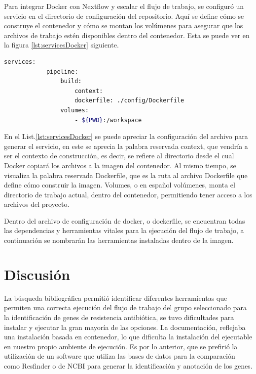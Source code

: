 \documentclass[12pt]{article}
\begin{document}
Para integrar Docker con Nextflow y escalar el 
flujo de trabajo, se configuró un servicio en el 
directorio de configuración del repositorio. Aquí se 
define cómo se construye el contenedor y cómo se montan 
los volúmenes para asegurar que los archivos de trabajo 
estén disponibles dentro del contenedor. Esta se puede ver 
en la figura \ref{lst:servicesDocker} siguiente.

\begin{center}
    \begin{lstlisting}[language=bash, caption=Código para la elaboración del servicio de docker \emph{(elaboración propia)}., label=lst:servicesDocker]
        services:
            pipeline:
                build:
                    context:
                    dockerfile: ./config/Dockerfile
                volumes:
                    - ${PWD}:/workspace
    \end{lstlisting}
\end{center}

En el List.\ref{lst:servicesDocker} se puede apreciar 
la configuración del archivo para generar el servicio, 
en este se aprecia la palabra reservada context, que 
vendría a ser el contexto de construcción, es decir, 
se refiere al directorio desde el cual Docker copiará 
los archivos a la imagen del contenedor. Al mismo tiempo, 
se visualiza la palabra reservada Dockerfile, que es la 
ruta al archivo Dockerfile que define cómo construir la 
imagen. Volumes, o en español volúmenes, monta el directorio 
de trabajo actual, dentro del contenedor, permitiendo tener 
acceso a los archivos del proyecto.

Dentro del archivo de configuración de docker, o 
dockerfile, se encuentran todas las dependencias  y 
herramientas vitales para la ejecución del flujo de 
trabajo, a continuación se nombrarán las herramientas 
instaladas dentro de la imagen.

\newpage
\section{Discusión}
La búsqueda bibliográfica permitió identificar diferentes herramientas que permiten
 una correcta ejecución del flujo de trabajo del grupo seleccionado para la 
 identificación de genes de resistencia antibiótica, se tuvo dificultades para 
 instalar y ejecutar la gran mayoría de las opciones. La documentación, reflejaba 
 una instalación basada en contenedor, lo que dificulta la instalación del ejecutable 
 en nuestro propio ambiente de ejecución. Es por lo anterior, que se prefirió la utilización 
 de un software que utiliza las bases de datos para la comparación como Resfinder 
 o de NCBI para generar la identificación y anotación de los genes. 
\end{document}
